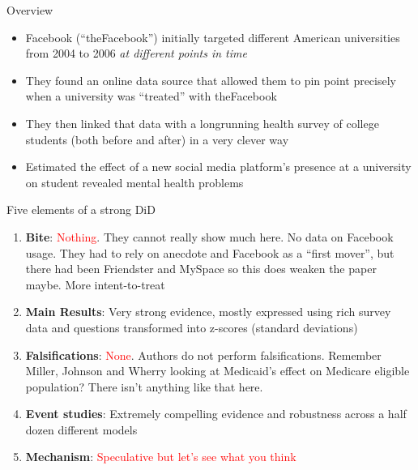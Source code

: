 \documentclass{beamer}
\begin{document}
\begin{frame}{Overview}

\begin{itemize}
\item Facebook (``theFacebook'') initially targeted different American universities from 2004 to 2006 \emph{at different points in time}
\item They found an online data source that allowed them to pin point precisely when a university was ``treated'' with theFacebook
\item They then linked that data with a longrunning health survey of college students (both before and after) in a very clever way
\item Estimated the effect of a new social media platform's presence at a university on student revealed mental health problems

\end{itemize}

\end{frame}




\begin{frame}{Five elements of a strong DiD}


\begin{enumerate}

\item \textbf{Bite}: \textcolor{red}{Nothing}. They cannot really show much here.  No data on Facebook usage.  They had to rely on anecdote and Facebook as a ``first mover'', but there had been Friendster and MySpace so this does weaken the paper maybe. More intent-to-treat
\item \textbf{Main Results}: Very strong evidence, mostly expressed using rich survey data and questions transformed into z-scores (standard deviations)
\item \textbf{Falsifications}: \textcolor{red}{None}. Authors do not perform falsifications. Remember Miller, Johnson and Wherry looking at Medicaid's effect on Medicare eligible population?  There isn't anything like that here.
\item \textbf{Event studies}: Extremely compelling evidence and robustness across a half dozen different models
\item \textbf{Mechanism}: \textcolor{red}{Speculative but let's see what you think}

\end{enumerate}

\end{frame}
\end{document}
